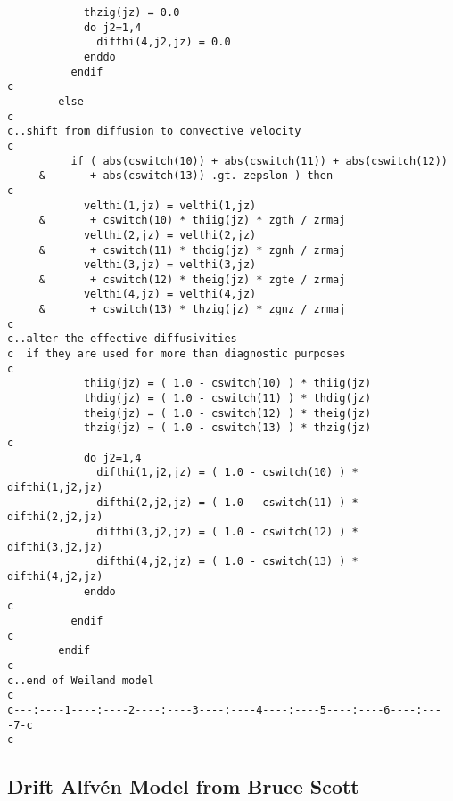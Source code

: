 \begin{verbatim}
            thzig(jz) = 0.0
            do j2=1,4
              difthi(4,j2,jz) = 0.0
            enddo
          endif
c
        else
c
c..shift from diffusion to convective velocity
c
          if ( abs(cswitch(10)) + abs(cswitch(11)) + abs(cswitch(12))
     &       + abs(cswitch(13)) .gt. zepslon ) then
c
            velthi(1,jz) = velthi(1,jz)
     &       + cswitch(10) * thiig(jz) * zgth / zrmaj
            velthi(2,jz) = velthi(2,jz)
     &       + cswitch(11) * thdig(jz) * zgnh / zrmaj
            velthi(3,jz) = velthi(3,jz)
     &       + cswitch(12) * theig(jz) * zgte / zrmaj
            velthi(4,jz) = velthi(4,jz)
     &       + cswitch(13) * thzig(jz) * zgnz / zrmaj
c
c..alter the effective diffusivities 
c  if they are used for more than diagnostic purposes
c
            thiig(jz) = ( 1.0 - cswitch(10) ) * thiig(jz)
            thdig(jz) = ( 1.0 - cswitch(11) ) * thdig(jz)
            theig(jz) = ( 1.0 - cswitch(12) ) * theig(jz)
            thzig(jz) = ( 1.0 - cswitch(13) ) * thzig(jz)
c
            do j2=1,4
              difthi(1,j2,jz) = ( 1.0 - cswitch(10) ) * difthi(1,j2,jz)
              difthi(2,j2,jz) = ( 1.0 - cswitch(11) ) * difthi(2,j2,jz)
              difthi(3,j2,jz) = ( 1.0 - cswitch(12) ) * difthi(3,j2,jz)
              difthi(4,j2,jz) = ( 1.0 - cswitch(13) ) * difthi(4,j2,jz)
            enddo
c
          endif
c
        endif
c
c..end of Weiland model
c
c---:----1----:----2----:----3----:----4----:----5----:----6----:----7-c
c
\end{verbatim}

\subsection{Drift Alfv\'en Model from Bruce Scott}

